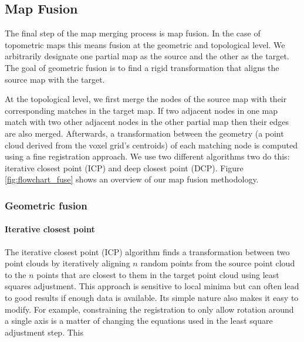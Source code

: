 \subsection{Map Fusion}
The final step of the map merging process is map fusion. In the case of topometric maps this means fusion at the geometric and topological level. We arbitrarily designate one partial map as the source and the other as the target. The goal of geometric fusion is to find a rigid transformation that aligns the source map with the target. 

At the topological level, we first merge the nodes of the source map with their corresponding matches in the target map. If two adjacent nodes in one map match with two other adjacent nodes in the other partial map then their edges are also merged. Afterwards, a transformation between the geometry (a point cloud derived from the voxel grid's centroids) of each matching node is computed using a fine registration approach. We use two different algorithms two do this: iterative closest point (ICP) and deep closest point (DCP). Figure \ref{fig:flowchart_fuse} shows an overview of our map fusion methodology.


\subsubsection{Geometric fusion}

\paragraph{Iterative closest point}
The iterative closest point (ICP) algorithm finds a transformation between two point clouds by iteratively aligning \(n\) random points from the source point cloud to the \(n\) points that are closest to them in the target point cloud using least squares adjustment. This approach is sensitive to local minima but can often lead to good results if enough data is available. Its simple nature also makes it easy to modify. For example, constraining the registration to only allow rotation around a single axis is a matter of changing the equations used in the least square adjustment step. This

